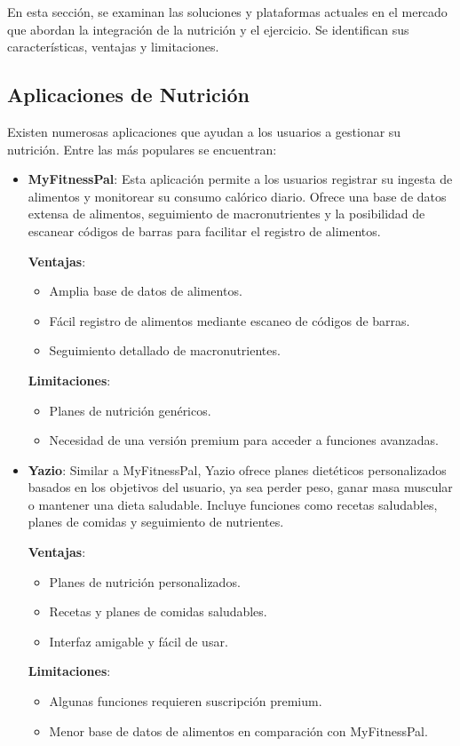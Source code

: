 En esta sección, se examinan las soluciones y plataformas actuales en el mercado que abordan la integración de la nutrición y el ejercicio. Se identifican sus características, ventajas y limitaciones.

\subsection{Aplicaciones de Nutrición}

Existen numerosas aplicaciones que ayudan a los usuarios a gestionar su nutrición. Entre las más populares se encuentran:

\begin{itemize}
  \item \textbf{MyFitnessPal}: Esta aplicación permite a los usuarios registrar su ingesta de alimentos y monitorear su consumo calórico diario. Ofrece una base de datos extensa de alimentos, seguimiento de macronutrientes y la posibilidad de escanear códigos de barras para facilitar el registro de alimentos.
  
    \textbf{Ventajas}:
    \begin{itemize}
      \item Amplia base de datos de alimentos.
      \item Fácil registro de alimentos mediante escaneo de códigos de barras.
      \item Seguimiento detallado de macronutrientes.
    \end{itemize}

    \textbf{Limitaciones}:
    \begin{itemize}
      \item Planes de nutrición genéricos.
      \item Necesidad de una versión premium para acceder a funciones avanzadas.
    \end{itemize}
  
  \item \textbf{Yazio}: Similar a MyFitnessPal, Yazio ofrece planes dietéticos personalizados basados en los objetivos del usuario, ya sea perder peso, ganar masa muscular o mantener una dieta saludable. Incluye funciones como recetas saludables, planes de comidas y seguimiento de nutrientes.

    \textbf{Ventajas}:
    \begin{itemize}
      \item Planes de nutrición personalizados.
      \item Recetas y planes de comidas saludables.
      \item Interfaz amigable y fácil de usar.
    \end{itemize}

    \textbf{Limitaciones}:
    \begin{itemize}
      \item Algunas funciones requieren suscripción premium.
      \item Menor base de datos de alimentos en comparación con MyFitnessPal.
    \end{itemize}
\end{itemize}

